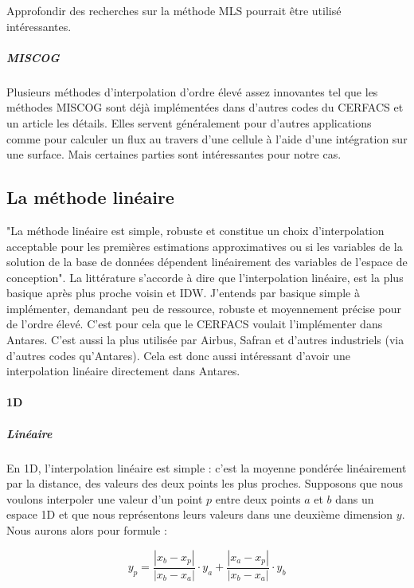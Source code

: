 Approfondir des recherches sur la méthode \ac{MLS}\cite{MLS}\cite{levin}  pourrait être utilisé intéressantes.

\subparagraph{MISCOG}

Plusieurs méthodes d'interpolation d'ordre élevé assez innovantes tel que les méthodes \ac{MISCOG} sont déjà implémentées dans d'autres codes du CERFACS et un article les détails\cite{laborderie2018}. Elles servent généralement pour d'autres applications comme pour calculer un flux au travers d'une cellule à l'aide d'une intégration sur une surface. Mais certaines parties sont intéressantes pour notre cas.  %


\subsection{La méthode linéaire}
"La méthode linéaire est simple, robuste et constitue un choix d'interpolation acceptable pour les premières estimations approximatives ou si les variables de la solution de la base de données dépendent linéairement des variables de l'espace de conception"\cite{palmer2009}.
La littérature\cite{fluidssengineer} s'accorde à dire que l'interpolation linéaire, est la plus basique après plus proche voisin et IDW. J'entends par basique simple à implémenter, demandant peu de ressource, robuste et moyennement précise pour de l'ordre élevé. C'est pour cela que le CERFACS voulait l'implémenter dans Antares. C'est aussi la plus utilisée par Airbus, Safran et d'autres industriels (via d'autres codes qu'Antares). Cela est donc aussi intéressant d'avoir une interpolation linéaire directement dans Antares.


\paragraph{1D}
\subparagraph{Linéaire}

En 1D, l'interpolation linéaire est simple : c'est la moyenne pondérée linéairement par la distance, des valeurs des deux points les plus proches.
Supposons que nous voulons interpoler une valeur d'un point \( p \) entre deux points \( a \) et \( b \) dans un espace 1D
et que nous représentons leurs valeurs dans une deuxième dimension \( y \).
Nous aurons alors pour formule :

\[
y_p = \frac{|x_b - x_p|}{|x_b - x_a|} \cdot y_a + \frac{|x_a - x_p|}{|x_b - x_a|} \cdot y_b
\]

